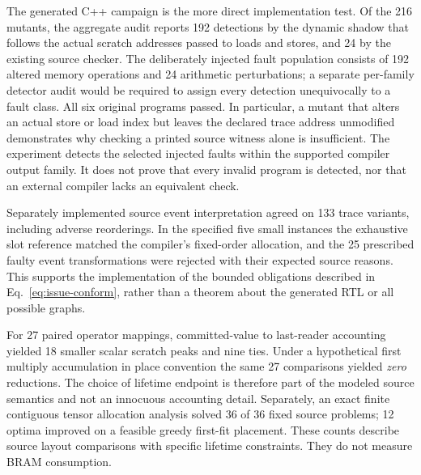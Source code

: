 \documentclass{article}
\begin{document}
The generated C++ campaign is the more direct implementation test. Of the 216 mutants, the aggregate audit reports 192 detections by the dynamic shadow that follows the actual scratch addresses passed to loads and stores, and 24 by the existing source checker. The deliberately injected fault population consists of 192 altered memory operations and 24 arithmetic perturbations; a separate per-family detector audit would be required to assign every detection unequivocally to a fault class. All six original programs passed. In particular, a mutant that alters an actual store or load index but leaves the declared trace address unmodified demonstrates why checking a printed source witness alone is insufficient. The experiment detects the selected injected faults within the supported compiler output family. It does not prove that every invalid program is detected, nor that an external compiler lacks an equivalent check.

Separately implemented source event interpretation agreed on 133 trace variants, including adverse reorderings. In the specified five small instances the exhaustive slot reference matched the compiler's fixed-order allocation, and the 25 prescribed faulty event transformations were rejected with their expected source reasons. This supports the implementation of the bounded obligations described in Eq.~\ref{eq:issue-conform}, rather than a theorem about the generated RTL or all possible graphs.


For 27 paired operator mappings, committed-value to last-reader accounting yielded 18 smaller scalar scratch peaks and nine ties. Under a hypothetical first multiply accumulation in place convention the same 27 comparisons yielded \emph{zero} reductions. The choice of lifetime endpoint is therefore part of the modeled source semantics and not an innocuous accounting detail. Separately, an exact finite contiguous tensor allocation analysis solved 36 of 36 fixed source problems; 12 optima improved on a feasible greedy first-fit placement. These counts describe source layout comparisons with specific lifetime constraints. They do not measure BRAM consumption.
\end{document}
